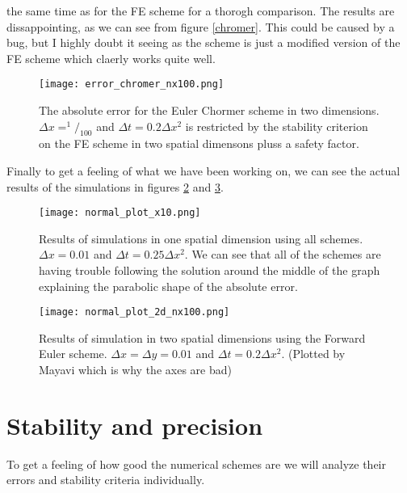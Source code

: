 \documentclass[a4paper,english, 10pt, twoside]{article}
\begin{document}
the same time as for the FE scheme for a thorogh comparison. The results are dissappointing, as we can see from figure \ref{chromer}. This could 
be caused by a bug, but I highly doubt it seeing as the scheme is just a modified version of the FE scheme which claerly works quite well.
\begin{figure}[H]
 \centering
 \texttt{[image: error\_chromer\_nx100.png]}
 \caption{The absolute error for the Euler Chormer scheme in two dimensions. $\Delta x = ^1/_{100}$ and $\Delta t = 0.2\Delta x^2$ is restricted 
 by the stability criterion on the FE scheme in two spatial dimensons pluss a safety factor. }
 \label{errors_FE2D_nx10}
\end{figure}
Finally to get a feeling of what we have been working on, we can see the actual results of the simulations in figures \ref{solution_1d} and 
\ref{solution_2d}.
\begin{figure}[H]
 \centering
 \texttt{[image: normal\_plot\_x10.png]}
 \caption{Results of simulations in one spatial dimension using all schemes. $\Delta x = 0.01$ and $\Delta t = 0.25\Delta x^2$. We can see that all
  of the schemes are having trouble following the solution around the middle of the graph explaining the parabolic shape of the absolute error.}
 \label{solution_1d}
\end{figure}
\begin{figure}[H]
 \centering
 \texttt{[image: normal\_plot\_2d\_nx100.png]}
 \caption{Results of simulation in two spatial dimensions using the Forward Euler scheme. $\Delta x = \Delta y = 0.01$ and $\Delta t = 0.2\Delta x^2$.
 (Plotted by Mayavi which is why the axes are bad)}
 \label{solution_2d}
\end{figure}
\section{Stability and precision}\label{stability}
To get a feeling of how good the numerical schemes are we will analyze their errors and stability criteria individually.
\end{document}
